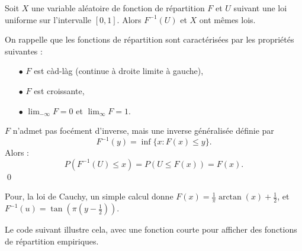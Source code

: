 \begin{lem}
Soit $X$ une variable aléatoire de fonction de répartition $F$ et $U$ suivant une loi uniforme sur l'intervalle $[0,1]$. Alors $F^{-1}(U)$ et $X$ ont mêmes lois.
\end{lem}

\begin{dem}
On rappelle que les fonctions de répartition sont caractérisées par les propriétés suivantes :
\begin{itemize}
\item[$\bullet$] $F$ est càd-làg (continue à droite limite à gauche),
\item[$\bullet$] $F$ est croissante,
\item[$\bullet$] $\lim_{-\infty} F =0$ et $\lim_\infty F =1$.
\end{itemize}
$F$ n'admet pas focément d'inverse, mais une inverse généralisée définie par 
\[F^{-1}(y) = \inf\{x : F(x)\leq y\}.\]
Alors :
\[P(F^{-1}(U)\leq x)= P(U\leq F(x)) = F(x).\]
\qed
\end{dem}
Pour, la loi de Cauchy, un simple calcul donne $F(x)=\frac{1}{\pi}\arctan(x)+\frac{1}{2}$, et $F^{-1}(u)=\tan(\pi(y-\frac{1}{2}))$. 

Le code suivant illustre cela, avec une fonction courte pour afficher des fonctions de répartition empiriques.\\

